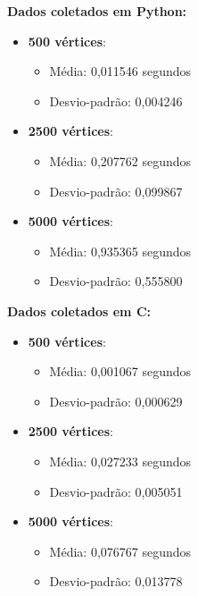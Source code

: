 \documentclass[12pt,a4paper]{report}
\begin{document}
\newpage

\textbf{Dados coletados em Python:}
\begin{itemize}
    \item \textbf{500 vértices}:
    \begin{itemize}
        \item Média: 0{,}011546 segundos
        \item Desvio-padrão: 0{,}004246
    \end{itemize}
    \item \textbf{2500 vértices}:
    \begin{itemize}
        \item Média: 0{,}207762 segundos
        \item Desvio-padrão: 0{,}099867
    \end{itemize}
    \item \textbf{5000 vértices}:
    \begin{itemize}
        \item Média: 0{,}935365 segundos
        \item Desvio-padrão: 0{,}555800
    \end{itemize}
\end{itemize}

\vspace{0.5em}
\textbf{Dados coletados em C:}
\begin{itemize}
    \item \textbf{500 vértices}:
    \begin{itemize}
        \item Média: 0{,}001067 segundos
        \item Desvio-padrão: 0{,}000629
    \end{itemize}
    \item \textbf{2500 vértices}:
    \begin{itemize}
        \item Média: 0{,}027233 segundos
        \item Desvio-padrão: 0{,}005051
    \end{itemize}
    \item \textbf{5000 vértices}:
    \begin{itemize}
        \item Média: 0{,}076767 segundos
        \item Desvio-padrão: 0{,}013778
    \end{itemize}
\end{itemize}
\end{document}
